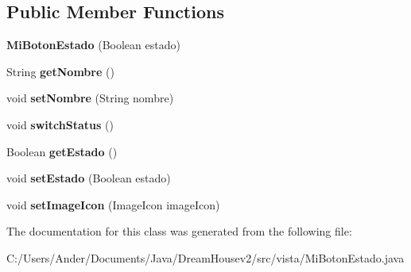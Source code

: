 \subsection*{Public Member Functions}
\begin{DoxyCompactItemize}
\item 
\mbox{\label{classvista_1_1_mi_boton_estado_ac7a7e4aa70b02f321423183b014e6b20}} 
{\bfseries Mi\+Boton\+Estado} (Boolean estado)
\item 
\mbox{\label{classvista_1_1_mi_boton_estado_a342f778571f033ad6d0ca8c633f1015f}} 
String {\bfseries get\+Nombre} ()
\item 
\mbox{\label{classvista_1_1_mi_boton_estado_a6649ee4877d13535560223e9893be0df}} 
void {\bfseries set\+Nombre} (String nombre)
\item 
\mbox{\label{classvista_1_1_mi_boton_estado_a3adf7c116ea22a32abb8897401c3272d}} 
void {\bfseries switch\+Status} ()
\item 
\mbox{\label{classvista_1_1_mi_boton_estado_a997a9b8cff0e7b872c062cf7844d1c93}} 
Boolean {\bfseries get\+Estado} ()
\item 
\mbox{\label{classvista_1_1_mi_boton_estado_a767f2c7dac98d8a235c957f1c4e01b8c}} 
void {\bfseries set\+Estado} (Boolean estado)
\item 
\mbox{\label{classvista_1_1_mi_boton_estado_ad4d9724658d80cbfc47afd59fe5833ef}} 
void {\bfseries set\+Image\+Icon} (Image\+Icon image\+Icon)
\end{DoxyCompactItemize}


The documentation for this class was generated from the following file\+:\begin{DoxyCompactItemize}
\item 
C\+:/\+Users/\+Ander/\+Documents/\+Java/\+Dream\+Housev2/src/vista/Mi\+Boton\+Estado.\+java\end{DoxyCompactItemize}
